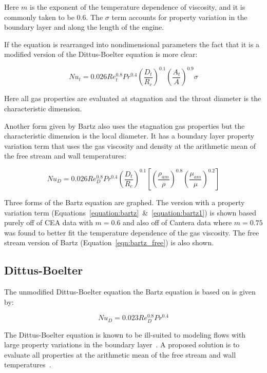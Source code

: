 \documentclass[11pt]{article}
\begin{document}
Here $m$ is the exponent of the temperature dependence of viscosity, and it is commonly taken to be 0.6. The $\sigma$ term accounts for property variation in the boundary layer and along the length of the engine.

If the equation is rearranged into nondimensional parameters the fact that it is a modified version of the Dittus-Boelter equation is more clear:

\begin{equation}\label{equation:bartz1}
  Nu_{t} = 0.026 Re_{t}^{0.8} Pr^{0.4} \left( \frac{D_t}{R_c} \right)^{0.1} \left( \frac{A_t}{A} \right)^{0.9} \sigma
\end{equation}

Here all gas properties are evaluated at stagnation and the throat diameter is the characteristic dimension.

Another form given by Bartz also uses the stagnation gas properties but the characteristic dimension is the local diameter. It has a boundary layer property variation term that uses the gas viscosity and density at the arithmetic mean of the free stream and wall temperatures:

\begin{equation}\label{eqn:bartz_free}
  Nu_{D} = 0.026 Re_{D}^{0.8} Pr^{0.4} \left( \frac{D_t}{R_c} \right)^{0.1} \left[ \left( \frac{\rho_{am}}{\rho} \right)^{0.8} \left(\frac{\mu_{am}}{\mu} \right)^{0.2}\right]
\end{equation}

Three forms of the Bartz equation are graphed. The version with a property variation term (Equations~\ref{equation:bartz}~\&~\ref{equation:bartz1}) is shown based purely off of CEA data with $m=0.6$ and also off of Cantera data where $m=0.75$ was found to better fit the temperature dependence of the gas viscosity. The free stream version of Bartz (Equation~\ref{eqn:bartz_free}) is also shown.

\subsection{Dittus-Boelter}

The unmodified Dittus-Boelter equation the Bartz equation is based on is given by:

\begin{equation}
  Nu_{D} = 0.023 Re_{D}^{0.8} Pr^{0.4}
\end{equation}

The Dittus-Boelter equation is known to be ill-suited to modeling flows with large property variations in the boundary layer~\cite{bergman_fundamentals_2017}. A proposed solution is to evaluate all properties at the arithmetic mean of the free stream and wall temperatures~\cite{bartz_turbulent_1965, grisson_liquid_1991}.
\end{document}
